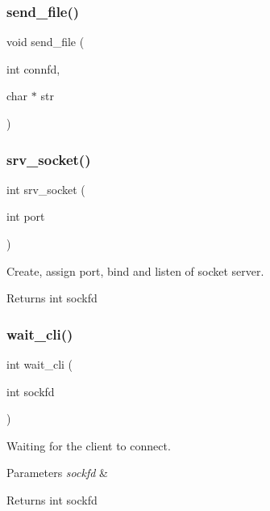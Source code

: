 \subsubsection{send\+\_\+file()}
{\footnotesize\ttfamily void send\+\_\+file (\begin{DoxyParamCaption}\item[{int}]{connfd,  }\item[{char $\ast$}]{str }\end{DoxyParamCaption})}

\mbox{\label{socket__server_8c_a8c5fec800b50ceb5bb108fb72a4b50b1}} 
\subsubsection{srv\+\_\+socket()}
{\footnotesize\ttfamily int srv\+\_\+socket (\begin{DoxyParamCaption}\item[{int}]{port }\end{DoxyParamCaption})}



Create, assign port, bind and listen of socket server. 

\begin{DoxyReturn}{Returns}
int sockfd 
\end{DoxyReturn}
\mbox{\label{socket__server_8c_ad26b08974642b47dc5bf48289824f655}} 
\subsubsection{wait\+\_\+cli()}
{\footnotesize\ttfamily int wait\+\_\+cli (\begin{DoxyParamCaption}\item[{int}]{sockfd }\end{DoxyParamCaption})}



Waiting for the client to connect. 


\begin{DoxyParams}{Parameters}
{\em sockfd} & \\
\hline
\end{DoxyParams}
\begin{DoxyReturn}{Returns}
int sockfd 
\end{DoxyReturn}
